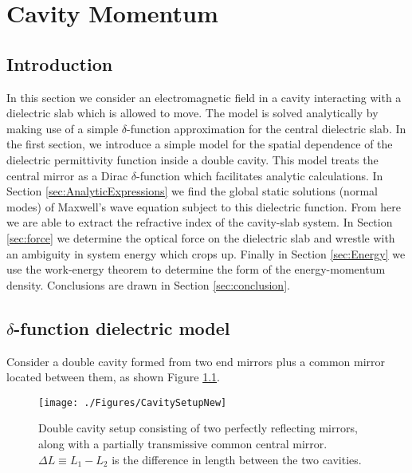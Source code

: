 \chapter{Cavity Momentum}


\section{Introduction}
\label{sec:intro}

In this section we consider an electromagnetic field in a cavity interacting with a dielectric slab which is allowed to move. The model is solved analytically by making use of a simple $\delta$-function approximation for the central dielectric slab. 
In the first section, we introduce a simple model for the spatial dependence of the dielectric permittivity function inside a double cavity. This model treats the central mirror as a Dirac $\delta$-function which facilitates analytic calculations. In Section \ref{sec:AnalyticExpressions} we find the global static solutions (normal modes) of Maxwell's wave equation subject to this dielectric function.  From here we are able to extract the refractive index of the cavity-slab system. In Section \ref{sec:force} we determine the optical force on the dielectric slab and wrestle with an ambiguity in system energy which crops up. Finally in Section \ref{sec:Energy} we use the work-energy theorem to determine the form of the energy-momentum density. Conclusions are drawn in Section \ref{sec:conclusion}. 




\section{$\delta$-function dielectric model}
\label{sec:deltafunctionmodel}



Consider a double cavity formed from two end mirrors plus a common mirror located between them, as shown Figure \ref{fig:cavitysetup}.  

\begin{figure}
\texttt{[image: ./Figures/CavitySetupNew]}
\caption{Double cavity setup consisting
of two perfectly reflecting mirrors, along with a partially transmissive common central mirror. $\Delta L \equiv L_{1}-L_{2}$ is the difference in length between the two cavities.}
\label{fig:cavitysetup}
\end{figure}

